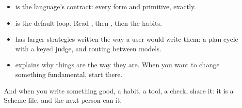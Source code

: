 \begin{itemize}
  \item {} is the language's contract: every form and
    primitive, exactly.
  \item {} is the default loop. Read
    , then , then the habits.
  \item {} has larger strategies written
    the way a user would write them: a plan cycle with a keyed judge, and
    routing between models.
  \item {} explains why things are the way they are. When you
    want to change something fundamental, start there.
\end{itemize}

And when you write something good, a habit, a tool, a check, share it: it
is a Scheme file, and the next person can  it.
